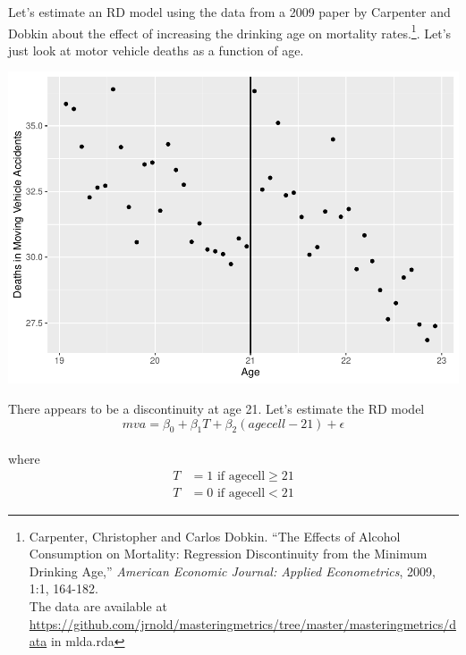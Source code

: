 \documentclass[]{book}
\newenvironment{Shaded}{\begin{snugshade}}{\end{snugshade}}
\newcommand{\DataTypeTok}[1]{\textcolor[rgb]{0.13,0.29,0.53}{#1}}
\newcommand{\DecValTok}[1]{\textcolor[rgb]{0.00,0.00,0.81}{#1}}
\newcommand{\KeywordTok}[1]{\textcolor[rgb]{0.13,0.29,0.53}{\textbf{#1}}}
\newcommand{\NormalTok}[1]{#1}
\newcommand{\OperatorTok}[1]{\textcolor[rgb]{0.81,0.36,0.00}{\textbf{#1}}}
\newcommand{\StringTok}[1]{\textcolor[rgb]{0.31,0.60,0.02}{#1}}
\let\rmarkdownfootnote\footnote%
\def\footnote{\protect\rmarkdownfootnote}
\begin{document}
Let's estimate an RD model using the data from a 2009 paper by Carpenter and Dobkin about the effect of increasing the drinking age on mortality rates.\footnote{Carpenter, Christopher and Carlos Dobkin. ``The Effects of Alcohol Consumption on Mortality: Regression Discontinuity from the Minimum Drinking Age,'' \emph{American Economic Journal: Applied Econometrics}, 2009, 1:1, 164-182.\\
  The data are available at \url{https://github.com/jrnold/masteringmetrics/tree/master/masteringmetrics/data} in mlda.rda}. Let's just look at motor vehicle deaths as a function of age.

\begin{Shaded}
\end{Shaded}

\includegraphics{bailey_files/figure-latex/unnamed-chunk-116-1.pdf}

There appears to be a discontinuity at age 21. Let's estimate the RD model \[mva = \beta_0+\beta_1T+\beta_2(agecell-21)+\epsilon\]\\
where\\
\[\begin{aligned}
T &= 1 \text{ if agecell} \geq 21 \\
T &= 0 \text{ if agecell} < 21
\end{aligned}\]
\end{document}
